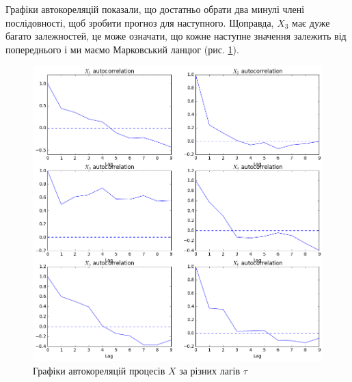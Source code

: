Графіки автокореляцій показали,
що достатньо обрати два минулі члені послідовності,
щоб зробити прогноз для наступного.
Щоправда, $X_3$ має дуже багато залежностей,
це може означати,
що кожне наступне значення залежить від попереднього
і ми маємо Марковський ланцюг (рис. \ref{fig:x:autocorrelation}).
\begin{figure}[h!]
  \centering
  \includegraphics[width=\textwidth]{Coursework2_files/Coursework2_8_0.png}
  \caption{Графіки автокореляцій процесів $X$ за різних лагів $\tau$}
  \label{fig:x:autocorrelation}
\end{figure}

